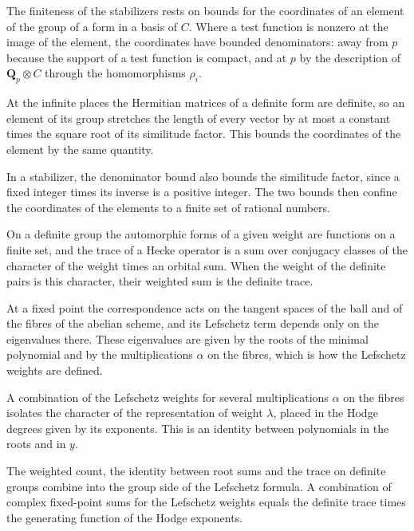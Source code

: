The finiteness of the stabilizers rests on bounds for the coordinates of an element of the group of a form
in a basis of $C$. Where a test function is nonzero at the image of the element, the coordinates have
bounded denominators: away from $p$ because the support of a test function is compact, and at $p$ by the
description of $\mathbf Q_p\otimes C$ through the homomorphisms $\rho_i$.

At the infinite places the Hermitian matrices of a definite form are definite, so an element of its group
stretches the length of every vector by at most a constant times the square root of its similitude
factor. This bounds the coordinates of the element by the same quantity.

In a stabilizer, the denominator bound also bounds the similitude factor, since a fixed integer times its
inverse is a positive integer. The two bounds then confine the coordinates of the elements to a finite
set of rational numbers.

On a definite group the automorphic forms of a given weight are functions on a finite set, and the trace
of a Hecke operator is a sum over conjugacy classes of the character of the weight times an orbital sum.
When the weight of the definite pairs is this character, their weighted sum is the definite trace.

At a fixed point the correspondence acts on the tangent spaces of the ball and of the fibres of the
abelian scheme, and its Lefschetz term depends only on the eigenvalues there. These eigenvalues are
given by the roots of the minimal polynomial and by the multiplications $\alpha$ on the fibres, which is
how the Lefschetz weights are defined.

A combination of the Lefschetz weights for several multiplications $\alpha$ on the fibres isolates the
character of the representation of weight $\lambda$, placed in the Hodge degrees given by its
exponents. This is an identity between polynomials in the roots and in $y$.

The weighted count, the identity between root sums and the trace on definite groups combine into the
group side of the Lefschetz formula. A combination of complex fixed-point sums for the Lefschetz weights
equals the definite trace times the generating function of the Hodge exponents.

